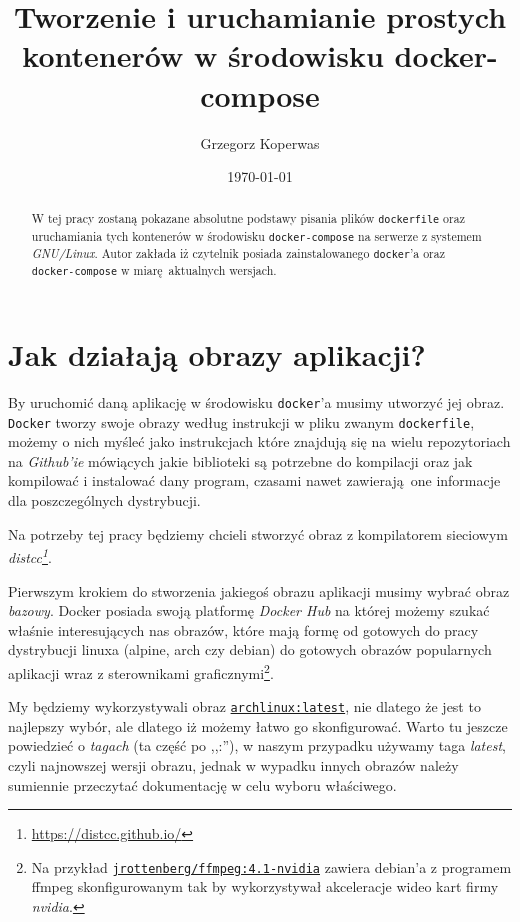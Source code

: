 \documentclass[a4paper,12pt]{article}
\title{Tworzenie i uruchamianie prostych kontenerów w środowisku  docker-compose}
\author{Grzegorz Koperwas}
\date{\today}
\begin{document}
\maketitle
\thispagestyle{fancy}

\begin{abstract}
    W tej pracy zostaną pokazane absolutne podstawy pisania plików \texttt{dockerfile} oraz uruchamiania tych kontenerów w środowisku \texttt{docker-compose} na serwerze z systemem \emph{GNU/Linux}. Autor zakłada iż czytelnik posiada zainstalowanego \texttt{docker}'a oraz \texttt{docker-compose} w miarę aktualnych wersjach.
\end{abstract}


\section{Jak działają obrazy aplikacji?}
\nocite{hightower2017kubernetes}
By uruchomić daną aplikację w środowisku \texttt{docker}'a musimy utworzyć jej obraz. \texttt{Docker} tworzy swoje obrazy według instrukcji w pliku zwanym \texttt{dockerfile}, możemy o nich myśleć jako instrukcjach które znajdują się na wielu repozytoriach na \emph{Github'ie} mówiących jakie biblioteki są potrzebne do kompilacji oraz jak kompilować i instalować dany program, czasami nawet zawierają one informacje dla poszczególnych dystrybucji.

Na potrzeby tej pracy będziemy chcieli stworzyć obraz z kompilatorem sieciowym \emph{distcc\footnote{\url{https://distcc.github.io/}}}.

Pierwszym krokiem do stworzenia jakiegoś obrazu aplikacji musimy wybrać obraz \emph{bazowy}. Docker posiada swoją platformę \emph{Docker Hub} na której możemy szukać właśnie interesujących nas obrazów, które mają formę od gotowych do pracy dystrybucji linuxa (alpine, arch czy debian) do gotowych obrazów popularnych aplikacji wraz z sterownikami graficznymi\footnote{Na przykład \texttt{\href{https://hub.docker.com/r/jrottenberg/ffmpeg/}{jrottenberg/ffmpeg:4.1-nvidia}} zawiera debian'a z programem ffmpeg skonfigurowanym tak by wykorzystywał akceleracje wideo kart firmy \emph{nvidia}.}.

My będziemy wykorzystywali obraz \texttt{\href{https://hub.docker.com/_/archlinux/}{archlinux:latest}}, nie dlatego że jest to najlepszy wybór, ale dlatego iż możemy łatwo go skonfigurować. Warto tu jeszcze powiedzieć o \emph{tagach} (ta część po ,,:''), w naszym przypadku używamy taga \emph{latest}, czyli najnowszej wersji obrazu, jednak w wypadku innych obrazów należy sumiennie przeczytać dokumentację w celu wyboru właściwego.
\end{document}

